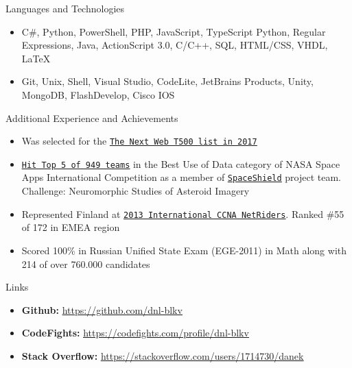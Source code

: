 \documentclass[calibri]{mcdowellcv}
\newcommand{\ultthref}[2]{\href{#1}{\underline{\texttt{#2}}}}
\newcommand{\ulurl}[1]{\underline{\url{#1}}}
\begin{document}
	\begin{cvsection}{Languages and Technologies}	
	\begin{cvsubsection}{}{}{}
		\begin{itemize}
			\item C\#, Python, PowerShell, PHP, JavaScript, TypeScript Python, Regular Expressions, Java, ActionScript 3.0, C/C++, SQL, HTML/CSS, VHDL, LaTeX
			\item Git, Unix, Shell, Visual Studio, CodeLite, JetBrains Products, Unity, MongoDB, FlashDevelop, Cisco IOS
		\end{itemize}
	\end{cvsubsection}
	\end{cvsection}
	
	\begin{cvsection}{Additional Experience and Achievements}		
		\begin{cvsubsection}{}{}{}
			\begin{itemize}
				\item Was selected for the \ultthref{https://thenextweb.com/conference/t500}{The Next Web T500 list in 2017}
				\item \ultthref{https://open.nasa.gov/blog/space-apps-2015-finalists-announced/}{Hit Top 5 of 949 teams} in the Best Use of Data category of NASA Space Apps International Competition as a member of \ultthref{https://2015.spaceappschallenge.org/project/spaceshield/}{SpaceShield} project team. Challenge: Neuromorphic Studies of Asteroid Imagery
				\item Represented Finland at \ultthref{http://www.academynetriders.com/file.php/1/netriders_info/pdfs/Results_2013_NetRiders_EMEA_International_CCNA.pdf}{2013 International CCNA NetRiders}. Ranked \#55 of 172 in EMEA region
				\item Scored 100\% in Russian Unified State Exam (EGE-2011) in Math along with 214 of over 760.000 candidates
			\end{itemize}
		\end{cvsubsection}
	\end{cvsection}

	\begin{cvsection}{Links}
		\begin{cvsubsection}{}{}{}
			\begin{itemize}
				\item \textbf{Github:} \ulurl{https://github.com/dnl-blkv}
				\item \textbf{CodeFights:} \ulurl{https://codefights.com/profile/dnl-blkv}
				\item \textbf{Stack Overflow:} \ulurl{https://stackoverflow.com/users/1714730/danek}
			\end{itemize}
		\end{cvsubsection}
	\end{cvsection}
\end{document}
